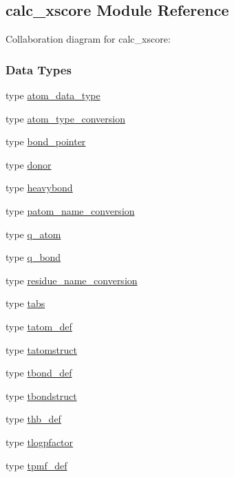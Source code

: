 \hypertarget{classcalc__xscore}{\subsection{calc\-\_\-xscore Module Reference}
\label{classcalc__xscore}
}


Collaboration diagram for calc\-\_\-xscore\-:
\subsubsection*{Data Types}
\begin{DoxyCompactItemize}
\item 
type \hyperlink{structcalc__xscore_1_1atom__data__type}{atom\-\_\-data\-\_\-type}
\item 
type \hyperlink{structcalc__xscore_1_1atom__type__conversion}{atom\-\_\-type\-\_\-conversion}
\item 
type \hyperlink{structcalc__xscore_1_1bond__pointer}{bond\-\_\-pointer}
\item 
type \hyperlink{structcalc__xscore_1_1donor}{donor}
\item 
type \hyperlink{structcalc__xscore_1_1heavybond}{heavybond}
\item 
type \hyperlink{structcalc__xscore_1_1patom__name__conversion}{patom\-\_\-name\-\_\-conversion}
\item 
type \hyperlink{structcalc__xscore_1_1q__atom}{q\-\_\-atom}
\item 
type \hyperlink{structcalc__xscore_1_1q__bond}{q\-\_\-bond}
\item 
type \hyperlink{structcalc__xscore_1_1residue__name__conversion}{residue\-\_\-name\-\_\-conversion}
\item 
type \hyperlink{structcalc__xscore_1_1tabs}{tabs}
\item 
type \hyperlink{structcalc__xscore_1_1tatom__def}{tatom\-\_\-def}
\item 
type \hyperlink{structcalc__xscore_1_1tatomstruct}{tatomstruct}
\item 
type \hyperlink{structcalc__xscore_1_1tbond__def}{tbond\-\_\-def}
\item 
type \hyperlink{structcalc__xscore_1_1tbondstruct}{tbondstruct}
\item 
type \hyperlink{structcalc__xscore_1_1thb__def}{thb\-\_\-def}
\item 
type \hyperlink{structcalc__xscore_1_1tlogpfactor}{tlogpfactor}
\item 
type \hyperlink{structcalc__xscore_1_1tpmf__def}{tpmf\-\_\-def}

\end{DoxyCompactItemize}
